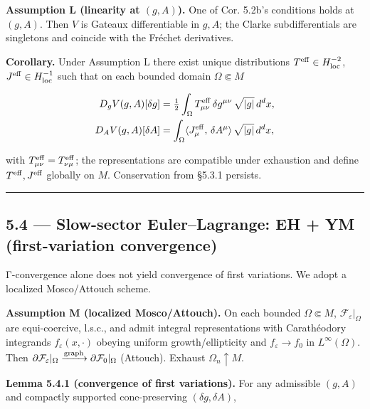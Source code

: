 \documentclass[
]{article}
\numberwithin{equation}{section}
\begin{document}
\textbf{Assumption L (linearity at \((g,A)\)).} One of Cor. 5.2b's
conditions holds at \((g,A)\). Then \(V\) is Gateaux differentiable in
\(g,A\); the Clarke subdifferentials are singletons and coincide with
the Fréchet derivatives.

\textbf{Corollary.} Under Assumption L there exist unique distributions
\(T^{\rm eff}\in H^{-2}_{\rm loc}\), \(J^{\rm eff}\in H^{-1}_{\rm loc}\)
such that on each bounded domain \(\Omega\Subset M\)

\[
\begin{aligned}
D_g V(g,A)[\delta g] &= \tfrac12\int_\Omega T^{\rm eff}_{\mu\nu}\,\delta g^{\mu\nu}\,\sqrt{|g|}\,d^dx,\\
D_A V(g,A)[\delta A] &= \int_\Omega \langle J^{\rm eff}_\mu,\,\delta A^\mu\rangle\,\sqrt{|g|}\,d^dx,
\end{aligned}
\]

with \(T^{\rm eff}_{\mu\nu}=T^{\rm eff}_{\nu\mu}\); the representations
are compatible under exhaustion and define \(T^{\rm eff},J^{\rm eff}\)
globally on \(M\). Conservation from §5.3.1 persists.

\begin{center}\rule{0.5\linewidth}{0.5pt}\end{center}

\hypertarget{slow-sector-eulerlagrange-eh-ym-first-variation-convergence}{%
\subsection{5.4 --- Slow-sector Euler--Lagrange: EH + YM
(first-variation
convergence)}\label{slow-sector-eulerlagrange-eh-ym-first-variation-convergence}}

Γ-convergence alone does not yield convergence of first variations. We
adopt a localized Mosco/Attouch scheme.

\textbf{Assumption M (localized Mosco/Attouch).} On each bounded
\(\Omega\Subset M\), \(\mathcal F_\varepsilon|_\Omega\) are
equi-coercive, l.s.c., and admit integral representations with
Carathéodory integrands \(f_\varepsilon(x,\cdot)\) obeying uniform
growth/ellipticity and \(f_\varepsilon\to f_0\) in \(L^\infty(\Omega)\).
Then
\(\partial \mathcal F_\varepsilon|_\Omega \xrightarrow{\rm graph} \partial \mathcal F_0|_\Omega\)
(Attouch). Exhaust \(\Omega_n\uparrow M\).

\textbf{Lemma 5.4.1 (convergence of first variations).} For any
admissible \((g,A)\) and compactly supported cone-preserving
\((\delta g,\delta A)\),
\end{document}

